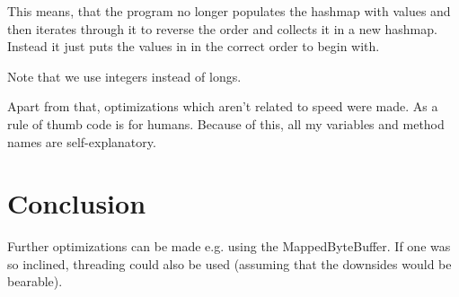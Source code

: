 \documentclass[a4paper, 12pt]{report}
\begin{document}
This means, that the program no longer populates the hashmap with values and then iterates through it to reverse the order and collects it in a new hashmap. Instead it just puts the values in in the correct order to begin with.

Note that we use integers instead of longs. 

Apart from that, optimizations which aren't related to speed were made. As a rule of thumb code is for humans. Because of this, all my variables and method names are self-explanatory. 

\chapter{Conclusion}
Further optimizations can be made e.g. using the MappedByteBuffer. If one was so inclined, threading could also be used (assuming that the downsides would be bearable).
\end{document}

